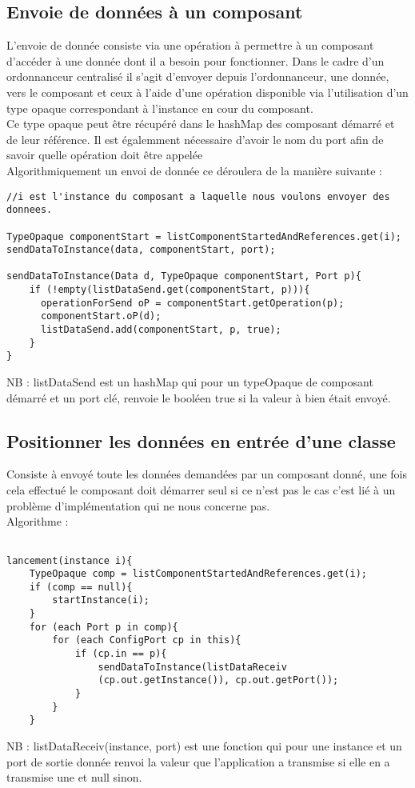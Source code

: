 \documentclass{article}
\begin{document}
\subsection{Envoie de données à un composant}
L'envoie de donnée consiste via une opération à permettre à un composant d'accéder à une donnée dont il a besoin pour fonctionner. Dans le cadre d'un ordonnanceur centralisé il s'agit d'envoyer depuis l'ordonnanceur, une donnée, vers le composant et ceux à l'aide d'une opération disponible via l'utilisation d'un type opaque correspondant à l'instance en cour du composant.\\
Ce type opaque peut être récupéré dans le hashMap des composant démarré et de leur référence. Il est égalemment nécessaire d'avoir le nom du port afin de savoir quelle opération doit être appelée\\
Algorithmiquement un envoi de donnée ce déroulera de la manière suivante :
\begin{lstlisting}[]
//i est l'instance du composant a laquelle nous voulons envoyer des donnees.

TypeOpaque componentStart = listComponentStartedAndReferences.get(i);
sendDataToInstance(data, componentStart, port);

sendDataToInstance(Data d, TypeOpaque componentStart, Port p){
    if (!empty(listDataSend.get(componentStart, p))){
      operationForSend oP = componentStart.getOperation(p);
      componentStart.oP(d);
      listDataSend.add(componentStart, p, true);
    }
}
\end{lstlisting}
NB : listDataSend est un hashMap qui pour un typeOpaque de composant démarré et un port clé, renvoie le booléen true si la valeur à bien était envoyé.

\subsection{Positionner les données en entrée d'une classe}
Consiste à envoyé toute les données demandées par un composant donné, une fois cela effectué le composant doit démarrer seul si ce n'est pas le cas c'est lié à un problème d'implémentation qui ne nous concerne pas.\\
Algorithme :
\begin{lstlisting}[]

lancement(instance i){
    TypeOpaque comp = listComponentStartedAndReferences.get(i);
    if (comp == null){
        startInstance(i);
    }
    for (each Port p in comp){
        for (each ConfigPort cp in this){
            if (cp.in == p){
                sendDataToInstance(listDataReceiv
                (cp.out.getInstance()), cp.out.getPort());
            }
        }
    }
\end{lstlisting}
NB : listDataReceiv(instance, port) est une fonction qui pour une instance et un port de sortie donnée renvoi la valeur que l'application a transmise si elle en a transmise une et null sinon.
\end{document}
